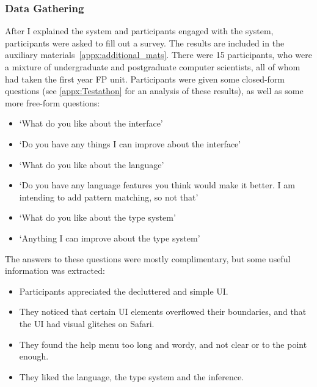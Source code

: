 \subsubsection{Data Gathering}
After I explained the system and participants engaged with the system, participants were asked to fill out a survey. The results are included in the auxiliary materials~\ref{appx:additional_mats}. There were 15 participants, who were a mixture of undergraduate and postgraduate computer scientists, all of whom had taken the first year \ac{FP} unit. Participants were given some closed-form questions (see \ref{appx:Testathon} for an analysis of these results), as well as some more free-form questions:
\begin{itemize}
    \item `What do you like about the interface'
    \item `Do you have any things I can improve about the interface'
    \item `What do you like about the language'
    \item `Do you have any language features you think would make it better. I am intending to add pattern matching, so not that'
    \item `What do you like about the type system'
    \item `Anything I can improve about the type system'
\end{itemize}

The answers to these questions were mostly complimentary, but some useful information was extracted:
\begin{itemize}
    \item Participants appreciated the decluttered and simple UI. 
    \item They noticed that certain UI elements overflowed their boundaries, and that the UI had visual glitches on Safari.
    \item They found the help menu too long and wordy, and not clear or to the point enough.
    \item They liked the language, the type system and the inference. 
\end{itemize}



